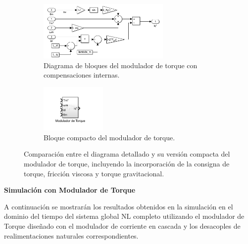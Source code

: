 \documentclass{article}
\begin{document}
\begin{figure}[H]
    \centering
    \begin{subfigure}[t]{\textwidth}
        \centering
        \includegraphics[width=0.7\textwidth]{Imagenes/modulador_torque.png}
        \caption{Diagrama de bloques del modulador de torque con compensaciones internas.}
        \label{fig:modulador_torque_1}
    \end{subfigure}
    
    \vspace{0.5cm} %
    
    \begin{subfigure}[t]{\textwidth}
        \centering
        \includegraphics[width=0.35\textwidth]{Imagenes/modulador_torque_compacto.png}
        \caption{Bloque compacto del modulador de torque.}
        \label{fig:modulador_torque_compacto}
    \end{subfigure}
    
    \caption{Comparación entre el diagrama detallado y su versión compacta del modulador de torque, incluyendo la incorporación de la consigna de torque, fricción viscosa y torque gravitacional.}
    \label{fig:subsistema_modulador_torque}
\end{figure}
\noindent\textbf{Simulación con Modulador de Torque}

A continuación se mostrarán los resultados obtenidos en la simulación en el dominio del tiempo del sistema global NL completo utilizando el modulador de Torque diseñado con el modulador de corriente en cascada y los desacoples de realimentaciones naturales correspondientes. 
\end{document}
